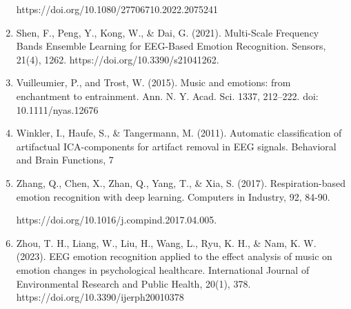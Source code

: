 \documentclass[fleqn,10pt]{SelfArx} %
\begin{document}
\begin{enumerate}
    https://doi.org/10.1080/27706710.2022.2075241
    \item Shen, F., Peng, Y., Kong, W., \& Dai, G. (2021). Multi-Scale Frequency Bands Ensemble Learning for EEG-Based Emotion Recognition. Sensors, 21(4), 1262. https://doi.org/10.3390/s21041262.
    \item Vuilleumier, P., and Trost, W. (2015). Music and emotions: from enchantment to entrainment. Ann. N. Y. Acad. Sci. 1337, 212–222. doi: 10.1111/nyas.12676
    \item Winkler, I., Haufe, S., \& Tangermann, M. (2011). Automatic classification of artifactual ICA-components for artifact removal in EEG signals. Behavioral and Brain Functions, 7
    \item Zhang, Q., Chen, X., Zhan, Q., Yang, T., \& Xia, S. (2017). Respiration-based emotion recognition with deep learning. Computers in Industry, 92, 84-90.
    
    https://doi.org/10.1016/j.compind.2017.04.005.
    \item Zhou, T. H., Liang, W., Liu, H., Wang, L., Ryu, K. H., \& Nam, K. W. (2023). EEG emotion recognition applied to the effect analysis of music on emotion changes in psychological healthcare. International Journal of Environmental Research and Public Health, 20(1), 378. https://doi.org/10.3390/ijerph20010378

    
    
\end{enumerate}


















































\end{document}
